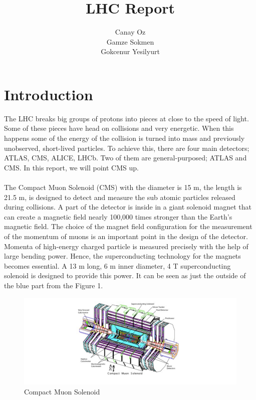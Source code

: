 \documentclass[11pt, oneside]{article}   	%
\title{LHC Report}
\author{Canay Oz\\Gamze Sokmen \\ Gokcenur Yesilyurt}
\begin{document}
\maketitle

\section{Introduction}

The LHC breaks big groups of protons into pieces at close to the speed of light. Some of these pieces have head on collisions and very energetic. When this happens some of the energy of the collision is turned into mass and previously unobserved, short-lived particles.
To achieve this, there are four main detectors; ATLAS, CMS, ALICE, LHCb. Two of them are general-purposed; ATLAS and CMS. In this report, we will point CMS up.
\\\\
The Compact Muon Solenoid (CMS) with the diameter is 15 m, the length is 21.5 m, is designed to detect and measure the sub atomic particles released during collisions. A part of the detector is inside in a giant solenoid magnet that can create a magnetic field nearly 100,000 times stronger than the Earth's magnetic field. 
The choice of the magnet field configuration for the measurement of the momentum of muons is an important point in the design of the detector. Momenta of high-energy charged particle is measured precisely with the help of large bending power. Hence, the superconducting technology for the magnets becomes essential. A 13 m long, 6 m inner diameter,
4 T superconducting solenoid is designed to provide this power. It can be seen as just the outside of the blue part from the Figure 1. 
\begin{figure}[H]
\begin{center}
\includegraphics[width=13cm]{a1.png}
\end{center}
\caption{Compact Muon Solenoid }
\end{figure}
\end{document}
